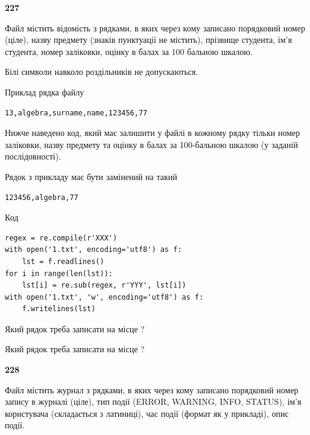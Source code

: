 \newpage

{\begin {center}\textbf{ 227}\end {center}}\par
Файл  містить відомість з рядками, в яких через кому записа\-но поряд\-ковий номер (ціле), назву предмету (знаків пунктуації не містить), прізвище студента, ім'я студента, номер заліковки, оцінку в балах за 100 бальною шкалою.

Білі символи навколо роздільників не допускаються.

Приклад рядка файлу



\begin{verbatim}
13,algebra,surname,name,123456,77
\end{verbatim}


Нижче наведено код, який має залишити у файлі в кожному рядку тільки номер заліковки, назву предмету та оцінку в балах за 100-бальною шкалою (у заданій послі\-дов\-ності).

Рядок з прикладу має бути замінений на такий



\begin{verbatim}
123456,algebra,77
\end{verbatim}




Код



\begin{verbatim}
regex = re.compile(r'XXX')
with open('1.txt', encoding='utf8') as f:
    lst = f.readlines()
for i in range(len(lst)):
    lst[i] = re.sub(regex, r'YYY', lst[i])
with open('1.txt', 'w', encoding='utf8') as f:
    f.writelines(lst)
\end{verbatim}







Який рядок треба записати на місце  ?\par
\vspace{5mm}


Який рядок треба записати на місце  ?\par


\newpage

{\begin {center}\textbf{ 228}\end {center}}\par
Файл  містить журнал з рядками, в яких через кому записано поряд\-ко\-вий номер запису в журналі (ціле), тип події (ERROR, WARNING, INFO, STATUS), ім'я користувача (складається з латиниці), час події (фор\-мат як у прикладі), опис події.


